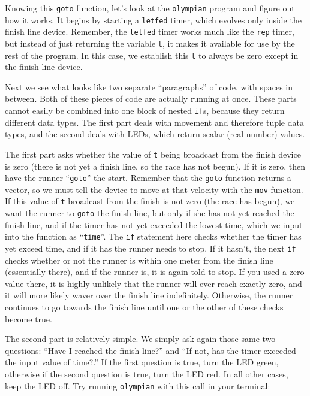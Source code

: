 \documentclass{article}
\newcommand\var[1]{{\tt #1}}
\newcommand\qvar[1]{``{\tt #1}''}
\begin{document}
Knowing this \var{goto} function, let's look at the \var{olympian}
program and figure out how it works.  It begins by starting a
\var{letfed} timer, which evolves only inside the finish line device.
Remember, the \var{letfed} timer works much like the \var{rep} timer,
but instead of just returning the variable \var{t}, it makes it
available for use by the rest of the program.  In this case, we
establish this \var{t} to always be zero except in the finish line
device.

Next we see what looks like two separate ``paragraphs'' of code, with
spaces in between.  Both of these pieces of code are actually running
at once.  These parts cannot easily be combined into one block of
nested \var{if}s, because they return different data types.  The first
part deals with movement and therefore tuple data types, and the
second deals with LEDs, which return scalar (real number) values.

The first part asks whether the value of \var{t} being broadcast from
the finish device is zero (there is not yet a finish line, so the race
has not begun).  If it is zero, then have the runner \qvar{goto} the
start.  Remember that the \var{goto} function returns a vector, so we
must tell the device to move at that velocity with the \var{mov}
function.  If this value of \var{t} broadcast from the finish is not
zero (the race has begun), we want the runner to \var{goto} the finish
line, but only if she has not yet reached the finish line, and if the
timer has not yet exceeded the lowest time, which we input into the
function as \qvar{time}.  The \var{if} statement here checks whether
the timer has yet exceed time, and if it has the runner needs to stop.
If it hasn't, the next \var{if} checks whether or not the runner is
within one meter from the finish line (essentially there), and if the
runner is, it is again told to stop.  If you used a zero value there,
it is highly unlikely that the runner will ever reach exactly zero,
and it will more likely waver over the finish line indefinitely.
Otherwise, the runner continues to go towards the finish line until
one or the other of these checks become true.

The second part is relatively simple. We simply ask again those same
two questions: ``Have I reached the finish line?'' and ``If not, has
the timer exceeded the input value of time?.''  If the first question
is true, turn the LED green, otherwise if the second question is true,
turn the LED red.  In all other cases, keep the LED off.  Try running
\var{olympian} with this call in your terminal:
\end{document}
